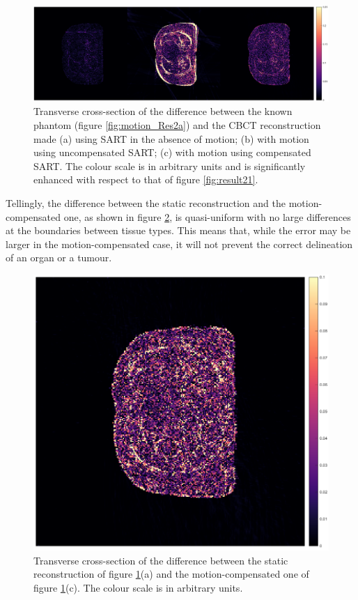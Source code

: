 \begin{figure}[H]
\begin{center}
\includegraphics[width=1\linewidth]{MotionCorrection/motion21errorXCAT.png}
\hspace{0.1cm}{\footnotesize (a)}\hspace{4.3cm}{\footnotesize (b)}\hspace{4.3cm}{\footnotesize (c)}

\caption{\label{fig:error2} Transverse cross-section of the difference between the known phantom (figure \ref{fig:motion_Res2a}) and the CBCT reconstruction made (a) using SART in the absence of motion; (b) with motion using uncompensated SART; (c) with motion using compensated SART.  The colour scale is in arbitrary units and is significantly enhanced with respect to that of figure \ref{fig:result21}.} 
\end{center}
\end{figure}

Tellingly, the difference between the static reconstruction and the motion-compensated one, as shown in figure \ref{fig:error23}, is quasi-uniform with no large differences at the boundaries between tissue types.  This means that, while the error may be larger in the motion-compensated case, it will not prevent the correct delineation of an organ or a tumour.

\begin{figure}[H]
\begin{center}
\includegraphics[width=0.6\linewidth]{MotionCorrection/motion2errorXCAT.png} 
\end{center}
\caption{\label{fig:error23} Transverse cross-section of the difference between the static reconstruction of figure \ref{fig:error2}(a) and the motion-compensated one of figure \ref{fig:error2}(c).  The colour scale is in arbitrary units.} 
\end{figure}

